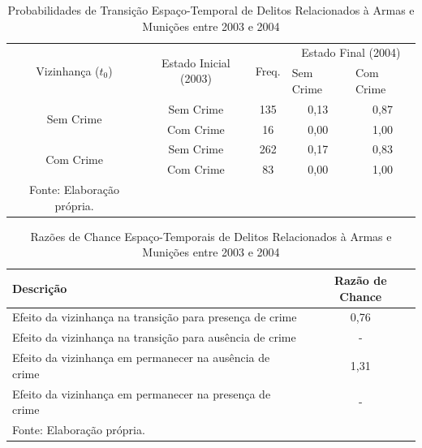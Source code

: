 \documentclass[12pt,openright,oneside,a4paper,english,french,spanish]{abntex2}
\numberwithin{table}{section} %
\numberwithin{figure}{section} %
\begin{document}
\begin{subappendices}
\begin{table}[H]
\centering
\caption{Probabilidades de Transição Espaço-Temporal de Delitos Relacionados à Armas e Munições entre 2003 e 2004}
        \begin{tabular}{ccccc}
            \hline
            \multirow{2}{*}{Vizinhança ($t_0$)} & \multirow{2}{*}{Estado Inicial (2003)} & \multirow{2}{*}{Freq.} & \multicolumn{2}{c}{Estado Final (2004)}  \\\cline{4-5} %
                                        & & & \multicolumn{1}{l}{Sem Crime} & \multicolumn{1}{l}{Com Crime} \\\hline
            \multirow{2}{*}{Sem Crime} & {Sem Crime} & 135 &  {0,13} & {0,87} \\
                                       & {Com Crime} & 16 &   {0,00} & {1,00} \\\hline
            \multirow{2}{*}{Com Crime} & {Sem Crime} & 262 &  {0,17} & {0,83} \\
                                       & {Com Crime} & 83 &   {0,00} & {1,00} \\\hline
            \tiny Fonte: Elaboração própria.
        \end{tabular}
    \label{tab:prob_espaco_tempo_rel_arma_2003_2004}
\end{table}


\begin{table}[H]
\centering
\caption{Razões de Chance Espaço-Temporais de Delitos Relacionados à Armas e Munições entre 2003 e 2004}
        \begin{tabular}{lc}
            \hline
            {\textbf{Descrição}} & {\textbf{Razão de Chance}} \\\hline
            {Efeito da vizinhança na transição para presença de crime} & {0,76} \\
            {Efeito da vizinhança na transição para ausência de crime} & {-} \\
            {Efeito da vizinhança em permanecer na ausência de crime} & {1,31} \\
            {Efeito da vizinhança em permanecer na presença de crime} & {-} \\\hline
            \tiny Fonte: Elaboração própria.
        \end{tabular}
    \label{tab:odds_espaco_tempo_rel_arma_2003_2004}
\end{table}
















\end{subappendices}
\end{document}

